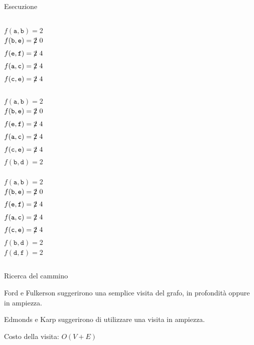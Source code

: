 \begin{frame}{Esecuzione}
\begin{columns}[T]
\begin{overprint}
$f(\mathtt{a},\mathtt{b}) = 2$\\
$f(\mathtt{b},\mathtt{e}) = \xout{2} \ 0$\\
$f(\mathtt{e},\mathtt{f}) = \xout{2} \ 4$\\
$f(\mathtt{a},\mathtt{c}) = \xout{2} \ 4$\\
$f(\mathtt{c},\mathtt{e}) = \xout{2} \ 4$\\
\\
$f(\mathtt{a},\mathtt{b}) = 2$\\
$f(\mathtt{b},\mathtt{e}) = \xout{2} \ 0$\\
$f(\mathtt{e},\mathtt{f}) = \xout{2} \ 4$\\
$f(\mathtt{a},\mathtt{c}) = \xout{2} \ 4$\\
$f(\mathtt{c},\mathtt{e}) = \xout{2} \ 4$\\
$f(\mathtt{b},\mathtt{d}) = 2$\\
\\
$f(\mathtt{a},\mathtt{b}) = 2$\\
$f(\mathtt{b},\mathtt{e}) = \xout{2} \ 0$\\
$f(\mathtt{e},\mathtt{f}) = \xout{2} \ 4$\\
$f(\mathtt{a},\mathtt{c}) = \xout{2} \ 4$\\
$f(\mathtt{c},\mathtt{e}) = \xout{2} \ 4$\\
$f(\mathtt{b},\mathtt{d}) = 2$\\
$f(\mathtt{d},\mathtt{f}) = 2$\\
\end{overprint}

\end{columns}

\end{frame}


\begin{frame}{Ricerca del cammino}

Ford e Fulkerson suggerirono una semplice visita del grafo, in profondità 
oppure in ampiezza.

\bigskip
Edmonds e Karp suggerirono di utilizzare una visita in ampiezza.

\bigskip
Costo della visita: $O(V+E)$


\end{frame}


